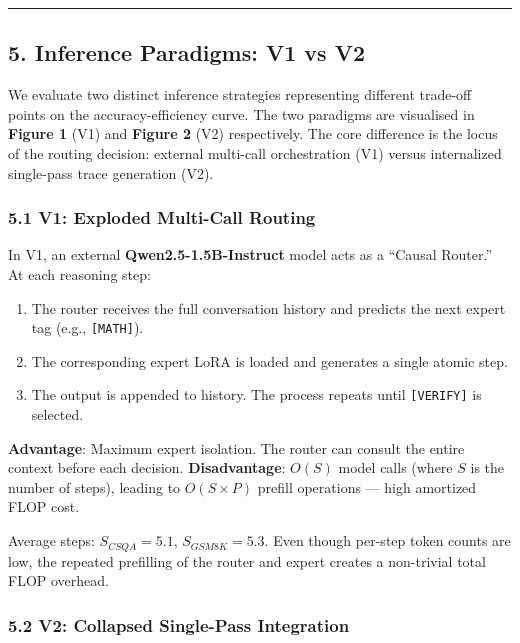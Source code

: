 \begin{center}\rule{0.5\linewidth}{0.5pt}\end{center}

\subsection{5. Inference Paradigms: V1 vs
V2}\label{inference-paradigms-v1-vs-v2}

We evaluate two distinct inference strategies representing different
trade-off points on the accuracy-efficiency curve. The two paradigms are
visualised in \textbf{Figure 1} (V1) and \textbf{Figure 2} (V2)
respectively. The core difference is the locus of the routing decision:
external multi-call orchestration (V1) versus internalized single-pass
trace generation (V2).

\subsubsection{5.1 V1: Exploded Multi-Call
Routing}\label{v1-exploded-multi-call-routing}

In V1, an external \textbf{Qwen2.5-1.5B-Instruct} model acts as a
``Causal Router.'' At each reasoning step:

\begin{enumerate}
\def\labelenumi{\arabic{enumi}.}
\tightlist
\item
  The router receives the full conversation history and predicts the
  next expert tag (e.g., \texttt{{[}MATH{]}}).
\item
  The corresponding expert LoRA is loaded and generates a single atomic
  step.
\item
  The output is appended to history. The process repeats until
  \texttt{{[}VERIFY{]}} is selected.
\end{enumerate}

\textbf{Advantage}: Maximum expert isolation. The router can consult the
entire context before each decision. \textbf{Disadvantage}: \(O(S)\)
model calls (where \(S\) is the number of steps), leading to
\(O(S \times P)\) prefill operations --- high amortized FLOP cost.

Average steps: \(S_{CSQA} = 5.1\), \(S_{GSM8K} = 5.3\). Even though
per-step token counts are low, the repeated prefilling of the router and
expert creates a non-trivial total FLOP overhead.

\subsubsection{5.2 V2: Collapsed Single-Pass
Integration}\label{v2-collapsed-single-pass-integration}

